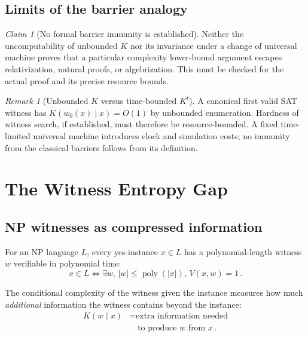 \documentclass[aps,prd,twocolumn,superscriptaddress,nofootinbib]{revtex4-2}
\theoremstyle{definition}
\theoremstyle{remark}
\newtheorem{remark}[theorem]{Remark}
\newtheorem{claim}[theorem]{Claim}
\DeclareMathOperator{\poly}{poly}
\begin{document}
\subsection{Limits of the barrier analogy}
\begin{claim}[No formal barrier immunity is established]
\label{claim:barrier_immune}
Neither the uncomputability of unbounded $K$ nor its invariance under
a change of universal machine proves that a particular complexity
lower-bound argument escapes relativization, natural proofs, or
algebrization. This must be checked for the actual proof and its
precise resource bounds.
\end{claim}
\begin{remark}[Unbounded $K$ versus time-bounded $K^t$]
\label{rem:barrier-K-vs-Kt}
A canonical first valid SAT witness has $K(w_0(x)\mid x)=O(1)$ by
unbounded enumeration. Hardness of witness search, if established,
must therefore be resource-bounded. A fixed time-limited universal
machine introduces clock and simulation costs; no immunity from the
classical barriers follows from its definition.
\end{remark}

\section{The Witness Entropy Gap}
\label{sec:gap}

\subsection{NP witnesses as compressed information}

For an NP language $L$, every yes-instance $x \in L$ has a polynomial-length witness $w$ verifiable in polynomial time:
\begin{equation}
x \in L \iff \exists w,\, |w| \leq \poly(|x|),\, V(x, w) = 1\,.
\end{equation}

The conditional complexity of the witness given the instance measures how much \textit{additional} information the witness contains beyond the instance:
\begin{equation}
\begin{aligned}
K(w \mid x)
&= \text{extra information needed}\\
&\quad \text{to produce } w \text{ from } x\,.
\end{aligned}
\end{equation}
\end{document}
